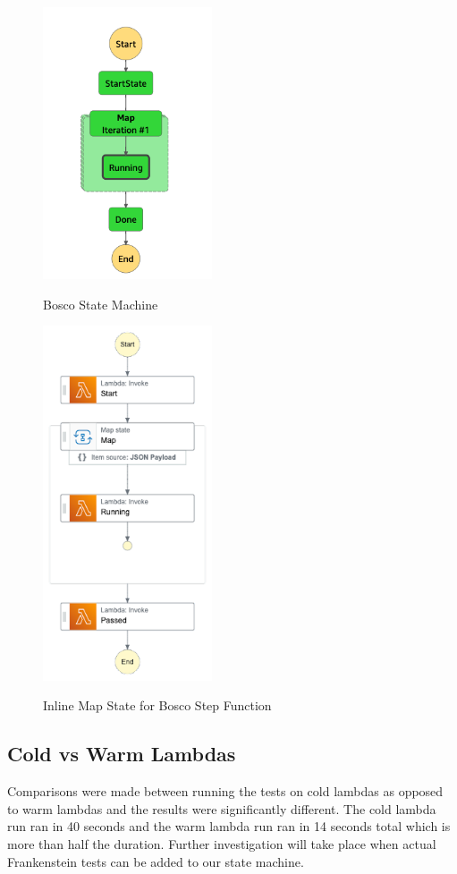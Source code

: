 \documentclass[12pt,a4paper,titlepage]{report}
\begin{document}
\begin{figure}
  \centering
  {\includegraphics[width=5cm]{./diagrams/step_function}}
  \caption{Bosco State Machine}
\end{figure}

\begin{figure}
  \centering
  {\includegraphics[width=5cm]{./diagrams/state_machine}}
  \caption{Inline Map State for Bosco Step Function}
\end{figure}

\subsection{Cold vs Warm Lambdas}

Comparisons were made between running the tests on cold lambdas as opposed to warm lambdas and the results were significantly different. The cold lambda run ran in 40 seconds and the warm lambda run ran in 14 seconds total which is more than half the duration. Further investigation will take place when actual Frankenstein tests can be added to our state machine.
\end{document}
